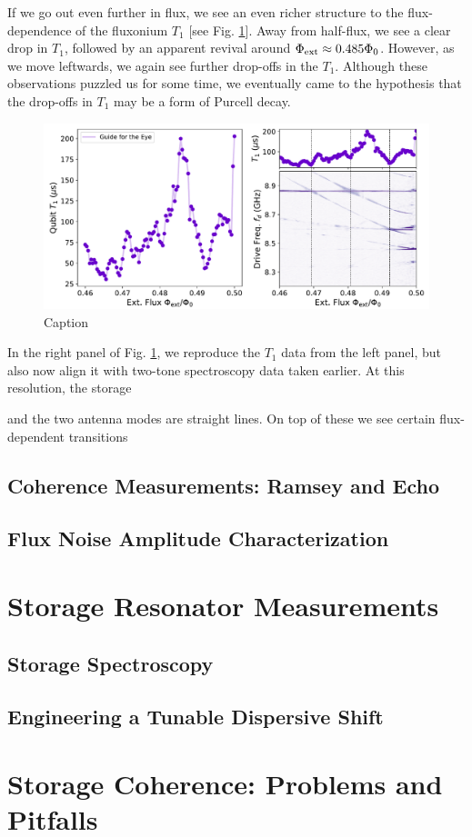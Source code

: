 If we go out even further in flux, we see an even richer structure to the flux-dependence of the fluxonium $T_1$ [see Fig. \ref{fig:4_qubit_T1_vs_flux_spec}]. Away from half-flux, we see a clear drop in $T_1$, followed by an apparent revival around $\Phi_{\rm ext} \approx 0.485\Phi_0$. However, as we move leftwards, we again see further drop-offs in the $T_1$. Although these observations puzzled us for some time, we eventually came to the hypothesis that the drop-offs in $T_1$ may be a form of Purcell decay.

\begin{figure}[h]
    \centering
    \includegraphics[width=0.95\linewidth]{Figures/4/qubit_T1_vs_flux_spec.pdf}
    \caption{Caption}
    \label{fig:4_qubit_T1_vs_flux_spec}
\end{figure}

In the right panel of Fig. \ref{fig:4_qubit_T1_vs_flux_spec}, we reproduce the $T_1$ data from the left panel, but also now align it with two-tone spectroscopy data taken earlier. At this resolution, the storage 


and the two antenna modes are straight lines. On top of these we see certain flux-dependent transitions



\subsection{Coherence Measurements: Ramsey and Echo}






\subsection{Flux Noise Amplitude Characterization}


\section{Storage Resonator Measurements \label{sec:4_StorageChi}}

\subsection{Storage Spectroscopy}

\subsection{Engineering a Tunable Dispersive Shift}

\section{Storage Coherence: Problems and Pitfalls \label{sec:4_StorageCoherenceProblems}}

